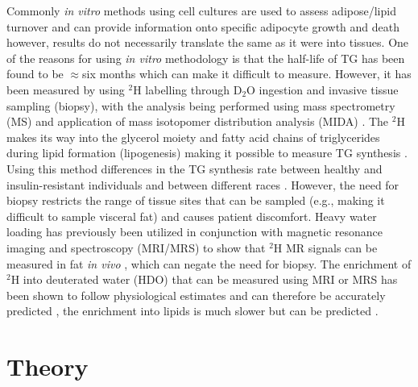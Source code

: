 \documentclass[class=article, crop=false]{standalone}
\begin{document}
Commonly \textit{in vitro} methods using cell cultures are used to assess adipose/lipid turnover and can provide information onto specific adipocyte growth and death \cite{Tchkonia2002FatPreadipocytes} however, results do not necessarily translate the same as it were into tissues. One of the reasons for using \textit{in vitro} methodology is that the half-life of TG has been found to be $\approx$six months \cite{Strawford2004AdiposeO} which can make it difficult to measure. However, it has been measured by using $^2$H labelling through D$_2$O ingestion and invasive tissue sampling (biopsy), with the analysis being performed using mass spectrometry (MS) and application of mass isotopomer distribution analysis (MIDA) \cite{White2019DynamicsDisease, Strawford2004AdiposeO, Belew2022DeTracers, Turner2003MeasurementMIDA}. The $^2$H makes its way into the glycerol moiety and fatty acid chains of triglycerides during lipid formation (lipogenesis) making it possible to measure TG synthesis \cite{Turner2003MeasurementMIDA}. Using this method differences in the TG synthesis rate between healthy and insulin-resistant individuals \cite{Allister2015InHumans} and between different races \cite{White2018RacialHumans}. However, the need for biopsy restricts the range of tissue sites that can be sampled (e.g., making it difficult to sample visceral fat) and causes patient discomfort. Heavy water loading has previously been utilized in conjunction with magnetic resonance imaging and spectroscopy (MRI/MRS) to show that $^2$H MR signals can be measured in fat \textit{in vivo} \cite{Brereton1989TheMice, Cocking2023DeuteriumDosing}, which can negate the need for biopsy. The enrichment of $^2$H into deuterated water (HDO) that can be measured using MRI or MRS has been shown to follow physiological estimates and can therefore be accurately predicted \cite{Cocking2023DeuteriumDosing}, the enrichment into lipids is much slower \cite{White2019DynamicsDisease, Strawford2004AdiposeO} but can be predicted \cite{White2019DynamicsDisease}.

\section{Theory}
\end{document}
